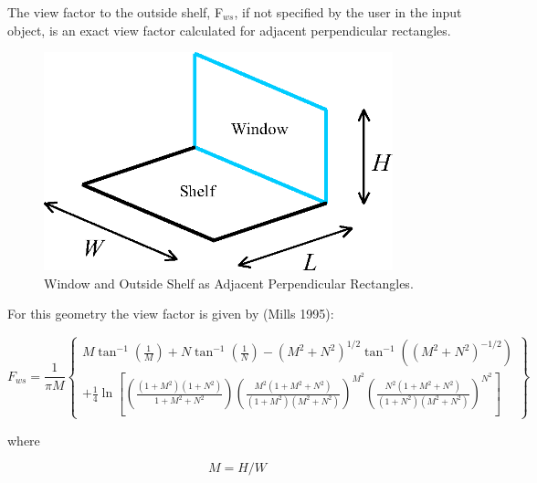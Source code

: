 The view factor to the outside shelf, F\(_{ws}\), if not specified by the user in the input object, is an exact view factor calculated for adjacent perpendicular rectangles.

\begin{figure}[hbtp] %
\centering
\includegraphics[width=0.9\textwidth, height=0.9\textheight, keepaspectratio=true]{media/image899.png}
\caption{Window and Outside Shelf as Adjacent Perpendicular Rectangles. \protect \label{fig:window-and-outside-shelf-as-adjacent}}
\end{figure}

For this geometry the view factor is given by (Mills 1995):

\begin{equation}
{F_{ws}} = \frac{1}{{\pi M}}\left\{ \begin{array}{l}M{\tan ^{ - 1}}\left( {\frac{1}{M}} \right) + N{\tan ^{ - 1}}\left( {\frac{1}{N}} \right) - {\left( {{M^2} + {N^2}} \right)^{1/2}}{\tan ^{ - 1}}\left( {{{\left( {{M^2} + {N^2}} \right)}^{ - 1/2}}} \right)\\ + \frac{1}{4}\ln \left[ {\left( {\frac{{\left( {1 + {M^2}} \right)\left( {1 + {N^2}} \right)}}{{1 + {M^2} + {N^2}}}} \right){{\left( {\frac{{{M^2}\left( {1 + {M^2} + {N^2}} \right)}}{{\left( {1 + {M^2}} \right)\left( {{M^2} + {N^2}} \right)}}} \right)}^{{M^2}}}{{\left( {\frac{{{N^2}\left( {1 + {M^2} + {N^2}} \right)}}{{\left( {1 + {N^2}} \right)\left( {{M^2} + {N^2}} \right)}}} \right)}^{{N^2}}}} \right]\end{array} \right\}
\end{equation}

where

\begin{equation}
M = H/W
\end{equation}

